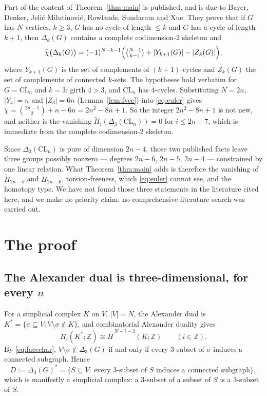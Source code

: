 \documentclass[11pt]{amsart}
\theoremstyle{definition}
\newcommand{\CL}{\mathrm{CL}}
\newcommand{\Dl}{\Delta}
\newcommand{\Zm}{\mathbb{Z}}
\begin{document}
Part of the content of Theorem~\ref{thm:main} is published, and is due to Bayer, Denker, Jeli\'c
Milutinovi\'c, Rowlands, Sundaram and Xue. They prove \cite{BayerII} that if $G$ has $N$ vertices,
$k\ge3$, $G$ has no cycle of length $\le k$ and $G$ has a cycle of length $k+1$, then $\Dl_k(G)$
contains a complete codimension-$2$ skeleton and
\begin{equation}\label{eq:euler}
 \widetilde\chi\bigl(\Dl_k(G)\bigr)
 =(-1)^{N-k-1}\Bigl(\tbinom{N-1}{k-1}+|Y_{k+1}(G)|-|Z_k(G)|\Bigr),
\end{equation}
where $Y_{k+1}(G)$ is the set of complements of $(k+1)$-cycles and $Z_k(G)$ the set of complements of
connected $k$-sets. The hypotheses hold verbatim for $G=\CL_n$ and $k=3$: girth $4>3$, and $\CL_n$
has $4$-cycles. Substituting $N=2n$, $|Y_4|=n$ and $|Z_3|=6n$ (Lemma~\ref{lem:fvec}) into
\eqref{eq:euler} gives $\widetilde\chi=\binom{2n-1}{2}+n-6n=2n^2-8n+1$. So the integer
$2n^2-8n+1$ is not new, and neither is the vanishing $\widetilde H_i(\Dl_3(\CL_n))=0$ for
$i\le2n-7$, which is immediate from the complete codimension-$2$ skeleton.

Since $\Dl_3(\CL_n)$ is pure of dimension $2n-4$, those two published facts leave three groups
possibly nonzero --- degrees $2n-6$, $2n-5$, $2n-4$ --- constrained by one linear relation. What
Theorem~\ref{thm:main} adds is therefore the vanishing of $\widetilde H_{2n-5}$ and
$\widetilde H_{2n-6}$, torsion-freeness, which \eqref{eq:euler} cannot see, and the homotopy type.
We have not found those three statements in the literature cited here, and we make no priority
claim: no comprehensive literature search was carried out.

\section{The proof}\label{sec:proof}

\subsection{The Alexander dual is three-dimensional, for every \texorpdfstring{$n$}{n}}

For a simplicial complex $K$ on $V$, $|V|=N$, the Alexander dual is
$K^{*}=\{\sigma\subseteq V: V\setminus\sigma\notin K\}$, and combinatorial Alexander duality
\cite{BjornerTancer} gives
\begin{equation}\label{eq:AD}
 \widetilde H_i(K^{*};\Zm)\cong\widetilde H^{\,N-i-3}(K;\Zm)\qquad(i\in\Zm).
\end{equation}
By \eqref{eq:facechar}, $V\setminus\sigma\notin\Dl_3(G)$ if and only if every $3$-subset of $\sigma$
induces a connected subgraph. Hence
\begin{equation}\label{eq:D}
 D:=\Dl_3(G)^{*}
 =\bigl\{S\subseteq V:\ \text{every $3$-subset of $S$ induces a connected subgraph}\bigr\},
\end{equation}
which is manifestly a simplicial complex: a $3$-subset of a subset of $S$ is a $3$-subset of $S$.
\end{document}
